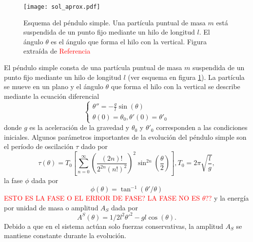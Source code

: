 \documentclass[aps,prb,twocolumn,superscriptaddress,floatfix,longbibliography]{revtex4-2}
\newif\ifptitle
\newif\ifpnumber
\newcounter{para}
\newcommand\ptitle[1]{\par\refstepcounter{para}
{\ifpnumber{\noindent\textcolor{lightgray}{\textbf{\thepara}}\indent}\fi}
{\ifptitle{\textbf{[{#1}]}}\fi}}
\begin{document}
\ptitle{Presentar ecuaciones de la dinámica}

\begin{figure}[h]
  \texttt{[image: sol\_aprox.pdf]}
  \caption{Esquema del péndulo simple. Una partícula puntual de masa $m$ está suspendida de un punto fijo mediante un hilo de longitud $l$. El ángulo $\theta$ es el ángulo que forma el hilo con la vertical. Figura extraída de \textcolor{red}{Referencia}}
   \label{fig:simple_esquema}
\end{figure}

El péndulo simple consta de una partícula puntual de masa $m$ suspendida de un punto fijo mediante un hilo de longitud $l$ (ver esquema en figura \ref{fig:simple_esquema}). La partícula se mueve en un plano y el ángulo $\theta$ que forma el hilo con la vertical se describe mediante la ecuación diferencial
\begin{equation}
  \left\{\begin{matrix}
    \theta'' = -\frac{g}{l} \sin{(\theta)} \\
    \theta(0) = \theta_0, \theta'(0) = \theta'_0
   \end{matrix}\right.
  \label{eq:pendulo_simple}
\end{equation}
donde $g$ es la aceleración de la gravedad y $\theta_0$ y $\theta'_0$ corresponden a las condiciones iniciales. Algunos parámetros importantes de la evolución del péndulo simple son el período de oscilación $\tau$ dado por
\begin{equation}
  \tau(\theta) = T_0 \left [ \sum_{n = 0}^\infty \left(  \frac{(2n)!}{2^{2n}(n!)^2} \right )^2 \sin^{2n} \left ( \frac{\theta}{2} \right )   \right ], T_0 = 2 \pi \sqrt{\frac{l}{g}},
  \label{eq:periodo_simple}
\end{equation}
la fase $\phi$ dada por
\begin{equation}
  \phi(\theta) = \tan^{-1}(\theta'/\theta)
  \label{eq:fase_simple}
\end{equation}
\textcolor{red}{ESTO ES LA FASE O EL ERROR DE FASE? LA FASE NO ES $\theta$??} y la energía por unidad de masa o amplitud $A_S$ dada por
\begin{equation}
  A^S(\theta) = 1/2 l^2 \theta'^2 - g l \cos{(\theta)}.
  \label{eq:amplitud_simple}
\end{equation}
Debido a que en el sistema actúan solo fuerzas conservativas, la amplitud $A_S$ se mantiene constante durante la evolución.
\end{document}
